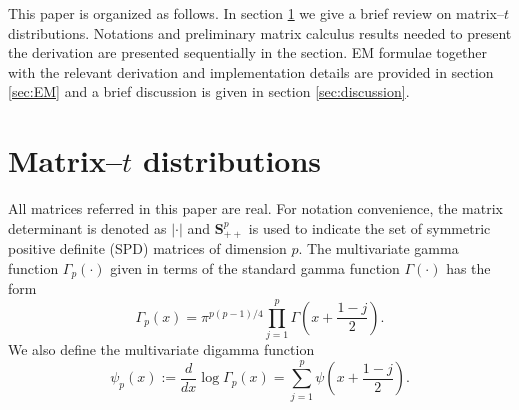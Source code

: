 \documentclass[english,listof=totoc]{scrartcl}
\begin{document}
This paper is organized as follows. In section \ref{sec:matrixt} we give a brief review on matrix--$t$ distributions. Notations and preliminary matrix calculus results needed to present the derivation are presented sequentially in the section. EM formulae together with the relevant derivation and implementation details are provided in section \ref{sec:EM} and a brief discussion is given in section \ref{sec:discussion}.

\section{Matrix--$t$ distributions}\label{sec:matrixt}

All matrices referred in this paper are real. For notation convenience, the matrix determinant is denoted as $|\cdot|$ and $\mathbf{S}_{++}^p$ is used to indicate the set of symmetric positive definite (SPD) matrices of dimension $p$. The multivariate gamma function $\Gamma_{p}(\cdot)$ given in terms of the standard gamma function $\Gamma(\cdot)$ has the form
\begin{equation}
\Gamma_{p}(x)=\pi^{p(p-1)/4}\prod_{j=1}^{p}\Gamma\left(x+\frac{1-j}{2}\right).\label{eq:multgammadef}
\end{equation}
We also define the multivariate digamma function
%
\begin{equation}
\psi_{p}(x):=\frac{d}{dx}\log\Gamma_{p}(x)=\sum_{j=1}^{p}\psi\left(x+\frac{1-j}{2}\right).
\end{equation}
\end{document}

